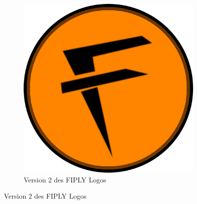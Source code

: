 \documentclass[FIPLY_base.tex]{subfiles}
\begin{document}
	\begin{figure}[H]
		\begin{subfigure}[b]{1\textwidth}
			\centering
			\includegraphics[scale=0.75]{img/icons/Version2}
			\centering
			\caption{Version 2 des FIPLY Logos}
		\end{subfigure}
	\end{figure}
\end{document}
